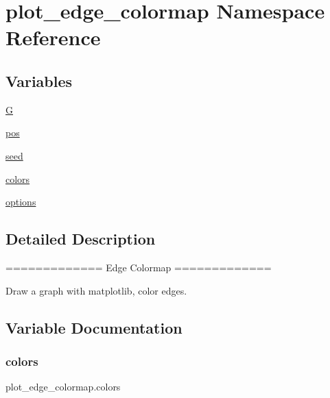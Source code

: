 \hypertarget{namespaceplot__edge__colormap}{}\section{plot\+\_\+edge\+\_\+colormap Namespace Reference}
\label{namespaceplot__edge__colormap}
\subsection*{Variables}
\begin{DoxyCompactItemize}
\item 
\hyperlink{namespaceplot__edge__colormap_adf831abe3be7e325fd1d187f144db178}{G}
\item 
\hyperlink{namespaceplot__edge__colormap_a2a144670e204c97115be2f7b7b87b8aa}{pos}
\item 
\hyperlink{namespaceplot__edge__colormap_a57e3dc3d09ee8b07cfede620ddb84005}{seed}
\item 
\hyperlink{namespaceplot__edge__colormap_a25133027542f65e419e6225bd4d98eb5}{colors}
\item 
\hyperlink{namespaceplot__edge__colormap_aefe9e86cfa2d72a40468df65839f4375}{options}
\end{DoxyCompactItemize}


\subsection{Detailed Description}
\begin{DoxyVerb}=============
Edge Colormap
=============

Draw a graph with matplotlib, color edges.
\end{DoxyVerb}
 

\subsection{Variable Documentation}
\mbox{\label{namespaceplot__edge__colormap_a25133027542f65e419e6225bd4d98eb5}} 
\subsubsection{\texorpdfstring{colors}{colors}}
{\footnotesize\ttfamily plot\+\_\+edge\+\_\+colormap.\+colors}

